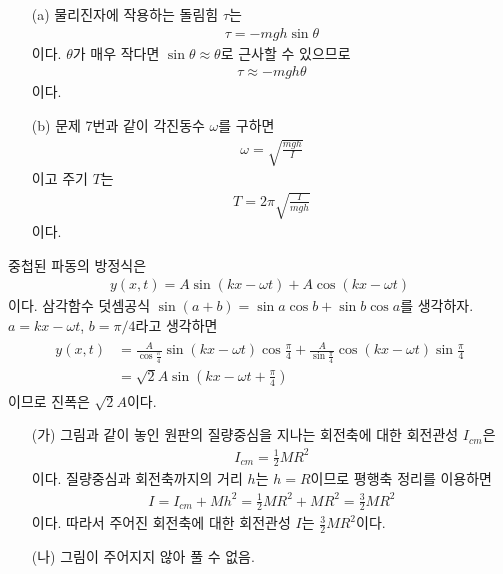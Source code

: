 \documentclass[floatfix,nofootinbib,superscriptaddress,fleqn]{revtex4-2}
\begin{document}
\begin{itemize}
  \item[(a)]
  물리진자에 작용하는 돌림힘 $\tau$는
  \begin{align}
    \tau = -mgh\sin\theta
  \end{align}
  이다. $\theta$가 매우 작다면 $\sin\theta\approx\theta$로 근사할 수 있으므로
  \begin{align}
    \tau \approx -mgh\theta
  \end{align}
  이다.
  \item[(b)] 
  문제 7번과 같이 각진동수 $\omega$를 구하면
  \begin{align}
    \omega = \sqrt{\frac{mgh}{I}}
  \end{align}
  이고 주기 $T$는
  \begin{align}
    T = 2\pi\sqrt{\frac{I}{mgh}}
  \end{align}
  이다.
\end{itemize}
\vspace{0.5cm}
 
중첩된 파동의 방정식은
\begin{align}
  y(x,t) = A\sin(kx-\omega t)+A\cos(kx-\omega t)
\end{align}
이다. 삼각함수 덧셈공식 $\sin(a+b) = \sin a\cos b+\sin b\cos a$를 생각하자.
$a = kx-\omega t$, $b= \pi/4$라고 생각하면
\begin{align}
  \begin{split}
    y(x,t) &= \frac{A}{\cos\frac{\pi}{4}}\sin(kx-\omega t)\cos\frac{\pi}{4}
    +\frac{A}{\sin\frac{\pi}{4}}\cos(kx-\omega t)\sin\frac{\pi}{4}  \\
    &=\sqrt{2}A\sin(kx-\omega t+\frac{\pi}{4})
  \end{split}
\end{align}
이므로 진폭은 $\sqrt{2}A$이다.

 

\vspace{0.5cm} 
\begin{itemize}
  \item[(가)]
  그림과 같이 놓인 원판의 질량중심을 지나는 회전축에 대한 회전관성 $I_{cm}$은
  \begin{align}
    I_{cm} = \frac{1}{2}MR^2
  \end{align}
  이다. 질량중심과 회전축까지의 거리 $h$는 $h=R$이므로
  평행축 정리를 이용하면
  \begin{align}
    I = I_{cm}+Mh^2=\frac{1}{2}MR^2 + MR^2 = \frac{3}{2}MR^2
  \end{align}
  이다. 따라서 주어진 회전축에 대한 회전관성 $I$는 $\frac{3}{2}MR^2$이다.
  \item[(나)] 
  그림이 주어지지 않아 풀 수 없음. 
\end{itemize}
\end{document}
